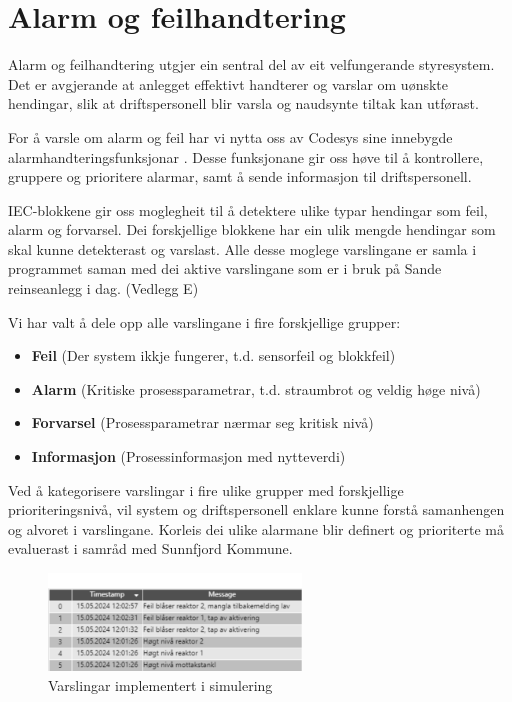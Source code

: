 \newpage
\section{Alarm og feilhandtering}
\thispagestyle{fancy}

Alarm og feilhandtering utgjer ein sentral del av eit velfungerande styresystem. Det er avgjerande
at anlegget effektivt handterer og varslar om uønskte hendingar, slik at 
driftspersonell blir varsla og naudsynte tiltak kan utførast. \nocite{Olav}

For å varsle om alarm og feil har vi nytta oss av \gls{Codesys} sine
innebygde alarmhandteringsfunksjonar \citep{CodesysAlarm}. Desse funksjonane gir oss høve til å 
kontrollere, gruppere og prioritere alarmar, samt å sende informasjon til driftspersonell.

\gls{IEC}-blokkene gir oss moglegheit til å detektere ulike typar hendingar som feil, alarm og forvarsel.
Dei forskjellige blokkene har ein ulik mengde hendingar som skal kunne detekterast og varslast.
Alle desse moglege varslingane er samla i programmet saman med dei aktive varslingane som er i bruk på Sande reinseanlegg i dag. (Vedlegg E)

Vi har valt å dele opp alle varslingane i fire forskjellige grupper:

\begin{itemize}
    \item \textbf{Feil}          (Der system ikkje fungerer, t.d. sensorfeil og blokkfeil)
    \item \textbf{Alarm}         (Kritiske prosessparametrar, t.d. straumbrot og veldig høge nivå)
    \item \textbf{Forvarsel}     (Prosessparametrar nærmar seg kritisk nivå)
    \item \textbf{Informasjon}   (Prosessinformasjon med nytteverdi)
\end{itemize}

Ved å kategorisere varslingar i fire ulike grupper med forskjellige prioriteringsnivå,
vil system og driftspersonell enklare kunne forstå samanhengen og alvoret i varslingane. \newline
Korleis dei ulike alarmane blir definert og prioriterte må evaluerast i samråd med \gls{Sunnfjord Kommune}.

\begin{figure}[htbp]
    \centering
    \includegraphics[width=0.6\textwidth]{Bilder/Alarmeksempel.png}
    \caption{Varslingar implementert i simulering}\label{fig:Alarmlogg}
\end{figure}

\newpage

